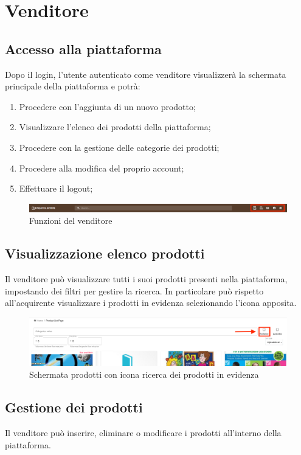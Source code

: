 \section{Venditore}
\subsection{Accesso alla piattaforma}
Dopo il login, l'utente autenticato come venditore visualizzerà la schermata principale della piattaforma e potrà:
\begin{enumerate}
	\item Procedere con l'aggiunta di un nuovo prodotto;
	\item Visualizzare l'elenco dei prodotti della piattaforma;
	\item Procedere con la gestione delle categorie dei prodotti;
	\item Procedere alla modifica del proprio account;
	\item Effettuare il logout;
\end{enumerate}
\begin{figure}[H]
	\centering
	\includegraphics[scale=0.4]{Immagini/Venditore/Header.png}
	\caption{Funzioni del venditore}
	\label{fig:FunzioniVenditore}
\end{figure}
\subsection{Visualizzazione elenco prodotti}
Il venditore può visualizzare tutti i suoi prodotti presenti nella piattaforma, impostando dei filtri per gestire la ricerca. In particolare può rispetto all'acquirente visualizzare i prodotti in evidenza selezionando l'icona apposita. 
\begin{figure}[H]
	\centering
	\includegraphics[scale=0.25]{Immagini/Venditore/plp.seller.png}
	\caption{Schermata prodotti con icona ricerca dei prodotti in evidenza}
	\label{fig:ProdottiEvidenza}
\end{figure}
\subsection{Gestione dei prodotti}
Il venditore può inserire, eliminare o modificare i prodotti all'interno della piattaforma.
